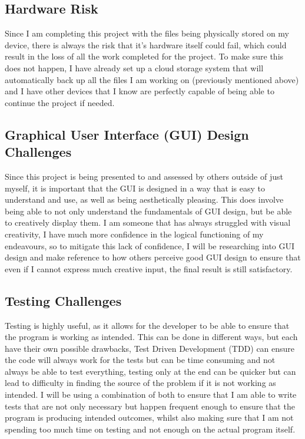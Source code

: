 \documentclass{article}
\begin{document}
\subsection{Hardware Risk}
Since I am completing this project with the files being physically stored on my device, there is always the risk that it's hardware itself could fail, which could result in the loss of all the work completed for the project. To make sure this does not happen, I have already set up a cloud storage system that will automatically back up all the files I am working on (previously mentioned above) and I have other devices that I know are perfectly capable of being able to continue the project if needed.

\subsection{Graphical User Interface (GUI) Design Challenges}
Since this project is being presented to and assessed by others outside of just myself, it is important that the GUI is designed in a way that is easy to understand and use, as well as being aesthetically pleasing. This does involve being able to not only understand the fundamentals of GUI design, but be able to creatively display them. I am someone that has always struggled with visual creativity, I have much more confidence in the logical functioning of my endeavours, so to mitigate this lack of confidence, I will be researching into GUI design and make reference to how others perceive good GUI design to ensure that even if I cannot express much creative input, the final result is still satisfactory.

\subsection{Testing Challenges}
Testing is highly useful, as it allows for the developer to be able to ensure that the program is working as intended. This can be done in different ways, but each have their own possible drawbacks, Test Driven Development (TDD) can ensure the code will always work for the tests but can be time consuming and not always be able to test everything, testing only at the end can be quicker but can lead to difficulty in finding the source of the problem if it is not working as intended. I will be using a combination of both to ensure that I am able to write tests that are not only necessary but happen frequent enough to ensure that the program is producing intended outcomes, whilst also making sure that I am not spending too much time on testing and not enough on the actual program itself.
\end{document}
